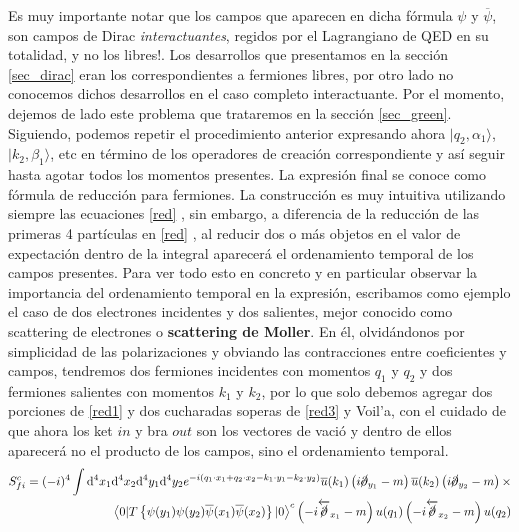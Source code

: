 \documentclass{article}
\numberwithin{equation}{section}
\begin{document}
Es muy importante notar que los campos que aparecen en dicha fórmula $\psi$ y $\overline{\psi}$,
son campos de Dirac \textit{interactuantes}, regidos por el Lagrangiano de
QED en su totalidad, y no los libres!. Los desarrollos que presentamos en la sección \ref{sec_dirac} eran los correspondientes a fermiones libres, por otro lado no conocemos dichos desarrollos en el caso completo interactuante. Por el momento, dejemos de lado este problema que trataremos en la sección \ref{sec_green}.\\

Siguiendo, podemos repetir el procedimiento anterior expresando ahora $ |q_2,\alpha_1 \rangle $, $ | k_2,\beta_{1} \rangle $, etc en término de los operadores de creación correspondiente y así seguir hasta
agotar todos los momentos presentes. La expresión final se conoce como fórmula de reducción
para fermiones. La construcción
es muy intuitiva utilizando siempre las ecuaciones \ref{red} , sin embargo,
a diferencia de la reducción de las primeras 4 partículas en \ref{red} , al reducir dos o más objetos en el valor de expectación dentro de la integral aparecerá el ordenamiento temporal de los campos presentes. Para ver todo esto en concreto y en particular observar
la importancia del ordenamiento temporal en la expresión, escribamos
como ejemplo el caso de dos electrones incidentes y dos salientes,
mejor conocido como scattering de electrones o \textbf{scattering de Moller}.
En él, olvidándonos por simplicidad de las polarizaciones y obviando
las contracciones entre coeficientes y campos, tendremos dos fermiones
incidentes con momentos $q_{1}$ y $q_{2}$ y dos fermiones salientes
con momentos $k_{1}$ y $k_{2}$, por lo que solo debemos agregar dos
porciones de \ref{red1}  y dos cucharadas soperas de \ref{red3}  y Voil'a, con el cuidado
de que ahora los ket $ in $ y bra $ out $ son los vectores de vació y dentro
de ellos aparecerá no el producto de los campos, sino el ordenamiento
temporal.
\begin{equation}\label{Moller}
\begin{aligned}
S_{fi}^{c} =(-i)^{4}\int \mathrm{d^4}x_{1}\mathrm{d^4}x_{2}\mathrm{d^4}y_{1}\mathrm{d^4}y_{2}e^{-i\left(q_{1}\cdot x_{1}+q_{2}\cdot x_{2} - k_{1}\cdot y_{1} -k_{2}\cdot y_{2}\right)}\overline{u}(k_{1})\left(i\cancel{\partial}_{y_{1}}-m\right)\overline{u}(k_{2})\left(i\cancel{\partial}_{y_{2}}-m\right) \times\\
\left\langle 0|T\left\{ \psi(y_{1})\psi(y_{2})\overline{\psi}(x_{1})\overline{\psi}(x_{2})\right\} |0\right\rangle ^{c}\left(-i\overleftarrow{\cancel{\partial}}_{x_{1}}-m\right)u(q_{1})\left(-i\overleftarrow{\cancel{\partial}}_{x_{2}}-m\right)u(q_{2})
\end{aligned}
\end{equation}
\end{document}
